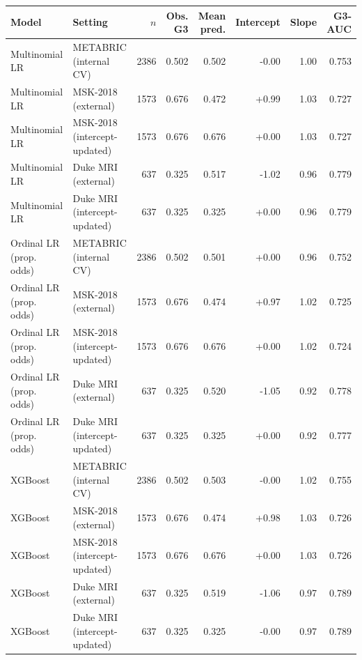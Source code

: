 \begin{tabular}{llrrrrrr}
\toprule
Model & Setting & $n$ & Obs. G3 & Mean pred. & Intercept & Slope & G3-AUC \\
\midrule
Multinomial LR & METABRIC (internal CV) & 2386 & 0.502 & 0.502 & -0.00 & 1.00 & 0.753 \\
Multinomial LR & MSK-2018 (external) & 1573 & 0.676 & 0.472 & +0.99 & 1.03 & 0.727 \\
Multinomial LR & MSK-2018 (intercept-updated) & 1573 & 0.676 & 0.676 & +0.00 & 1.03 & 0.727 \\
Multinomial LR & Duke MRI (external) & 637 & 0.325 & 0.517 & -1.02 & 0.96 & 0.779 \\
Multinomial LR & Duke MRI (intercept-updated) & 637 & 0.325 & 0.325 & +0.00 & 0.96 & 0.779 \\
Ordinal LR (prop. odds) & METABRIC (internal CV) & 2386 & 0.502 & 0.501 & +0.00 & 0.96 & 0.752 \\
Ordinal LR (prop. odds) & MSK-2018 (external) & 1573 & 0.676 & 0.474 & +0.97 & 1.02 & 0.725 \\
Ordinal LR (prop. odds) & MSK-2018 (intercept-updated) & 1573 & 0.676 & 0.676 & +0.00 & 1.02 & 0.724 \\
Ordinal LR (prop. odds) & Duke MRI (external) & 637 & 0.325 & 0.520 & -1.05 & 0.92 & 0.778 \\
Ordinal LR (prop. odds) & Duke MRI (intercept-updated) & 637 & 0.325 & 0.325 & +0.00 & 0.92 & 0.777 \\
XGBoost & METABRIC (internal CV) & 2386 & 0.502 & 0.503 & -0.00 & 1.02 & 0.755 \\
XGBoost & MSK-2018 (external) & 1573 & 0.676 & 0.474 & +0.98 & 1.03 & 0.726 \\
XGBoost & MSK-2018 (intercept-updated) & 1573 & 0.676 & 0.676 & +0.00 & 1.03 & 0.726 \\
XGBoost & Duke MRI (external) & 637 & 0.325 & 0.519 & -1.06 & 0.97 & 0.789 \\
XGBoost & Duke MRI (intercept-updated) & 637 & 0.325 & 0.325 & -0.00 & 0.97 & 0.789 \\
\bottomrule
\end{tabular}